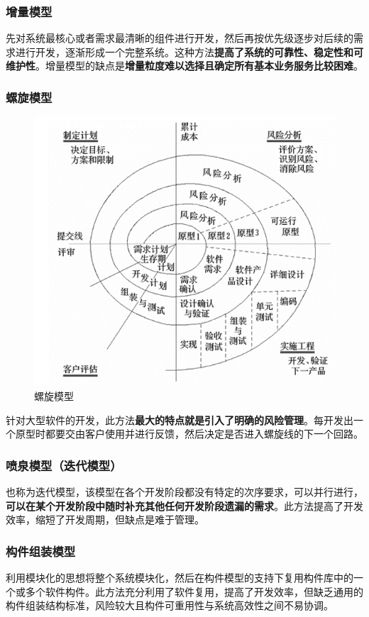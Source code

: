 \documentclass[chapter.computer_science.tex]{subfiles}
\begin{document}
\subsubsection{增量模型}
先对系统最核心或者需求最清晰的组件进行开发，然后再按优先级逐步对后续的需求进行开发，逐渐形成一个完整系统。这种方法{\bfseries 提高了系统的可靠性、稳定性和可维护性}。增量模型的缺点是{\bfseries 增量粒度难以选择且确定所有基本业务服务比较困难}。
\subsubsection{螺旋模型}
\begin{figure}[H]
    \centering
    \includegraphics[scale=0.5]{./images/0033.png}
    \caption{螺旋模型}
\end{figure}
针对大型软件的开发，此方法{\bfseries 最大的特点就是引入了明确的风险管理}。每开发出一个原型时都要交由客户使用并进行反馈，然后决定是否进入螺旋线的下一个回路。
\subsubsection{喷泉模型（迭代模型）}
也称为迭代模型，该模型在各个开发阶段都没有特定的次序要求，可以并行进行，{\bfseries 可以在某个开发阶段中随时补充其他任何开发阶段遗漏的需求}。此方法提高了开发效率，缩短了开发周期，但缺点是难于管理。
\subsubsection{构件组装模型}
利用模块化的思想将整个系统模块化，然后在构件模型的支持下复用构件库中的一个或多个软件构件。此方法充分利用了软件复用，提高了开发效率，但缺乏通用的构件组装结构标准，风险较大且构件可重用性与系统高效性之间不易协调。
\end{document}
